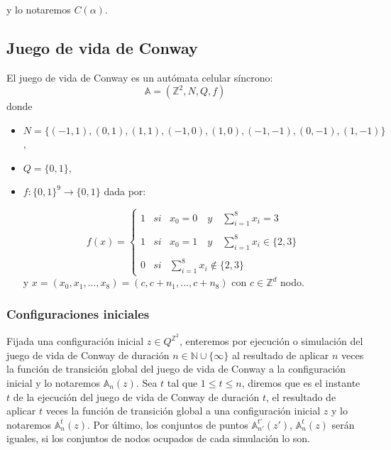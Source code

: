 \documentclass[../proyecto.tex]{memoir}
\begin{document}
y lo notaremos $C(\alpha)$.
\subsection{Juego de vida de Conway}

\begin{defi}  \label{original}
El juego de vida de Conway es un autómata celular síncrono: $$
\mathds{A} = (\mathds{Z}^{2}, N, Q, f)
$$
donde
\begin{itemize}
\item $N=\{(-1, 1), (0, 1), (1, 1), (-1, 0), (1, 0), (-1,-1), (0,-1), (1,-1) \}$,
\item $Q=\{0,1\}$,
\item $f:\{0,1\}^{9} \rightarrow \{0,1\} $ dada por:

\begin{equation} \label{trans}
f(x)= \left\{ \begin{array}{lcc}
             1 &   si  & x_{0}=0 \quad y \quad \sum_{i=1}^{8} x_i = 3 \\
             \\ 1 & si & x_{0}=1 \quad y \quad \sum_{i=1}^{8} x_i \in \{2 ,3\} \\
             \\ 0 &  si  & \sum_{i=1}^{8} x_i \notin \{2, 3\} \
             \end{array}
   \right. 
\end{equation}
y $x = (x_{0}, x_{1}, ...,x_{8}) = (c,c+n_{1},...,c+n_{8})$ con $c \in \mathds{Z} ^{d}$ nodo.

\end{itemize}
\end{defi}

\subsubsection{Configuraciones iniciales}

Fijada una configuración inicial $z\in Q^{\mathds{Z}^{2}}$, enteremos por ejecución o simulación del juego de vida de Conway de duración $n \in \mathds{N} \cup \{ \infty\}$ al resultado de aplicar $n$ veces la función de transición global del juego de vida de Conway a la configuración inicial y lo notaremos $\mathds{A}_{n}(z)$. Sea $t$ tal que $1 \leq t \leq n$, diremos que es el instante $t$ de la ejecución del juego de vida de Conway de duración $t$, el resultado de aplicar $t$ veces la función de transición global a una configuración inicial $z$ y lo notaremos $\mathds{A}^t_n(z)$. Por último, los conjuntos de puntos $\mathds{A}^{t'}_{n'}(z')$, $\mathds{A}^{t}_{n}(z)$ serán iguales, si los conjuntos de nodos ocupados de cada simulación lo son. 
\end{document}
